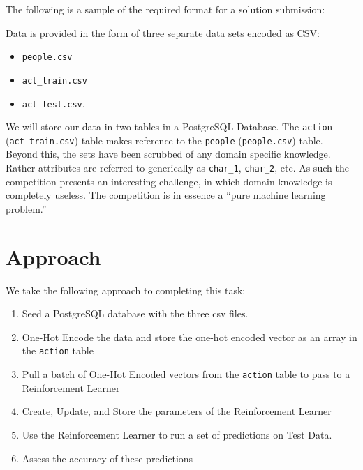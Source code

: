 \documentclass[]{report}
\newenvironment{Shaded}{}{}
\newcommand{\KeywordTok}[1]{\textcolor[rgb]{0.00,0.44,0.13}{\textbf{{#1}}}}
\newcommand{\NormalTok}[1]{{#1}}
\begin{document}
The following is a sample of the required format for a solution
submission:

\begin{Shaded}
\end{Shaded}

Data is provided in the form of three separate data sets encoded as CSV:

\begin{itemize}
\tightlist
\item
  \texttt{people.csv}
\item
  \texttt{act\_train.csv}
\item
  \texttt{act\_test.csv}.
\end{itemize}

We will store our data in two tables in a PostgreSQL Database. The
\texttt{action} (\texttt{act\_train.csv}) table makes reference to the
\texttt{people} (\texttt{people.csv}) table. Beyond this, the sets have
been scrubbed of any domain specific knowledge. Rather attributes are
referred to generically as \texttt{char\_1}, \texttt{char\_2}, etc. As
such the competition presents an interesting challenge, in which domain
knowledge is completely useless. The competition is in essence a ``pure
machine learning problem.''

\chapter{Approach}\label{approach}

We take the following approach to completing this task:

\begin{enumerate}
\def\labelenumi{\arabic{enumi}.}
\tightlist
\item
  Seed a PostgreSQL database with the three csv files.
\item
  One-Hot Encode the data and store the one-hot encoded vector as an
  array in the \texttt{action} table
\item
  Pull a batch of One-Hot Encoded vectors from the \texttt{action} table
  to pass to a Reinforcement Learner
\item
  Create, Update, and Store the parameters of the Reinforcement Learner
\item
  Use the Reinforcement Learner to run a set of predictions on Test
  Data.
\item
  Assess the accuracy of these predictions
\end{enumerate}
\end{document}
